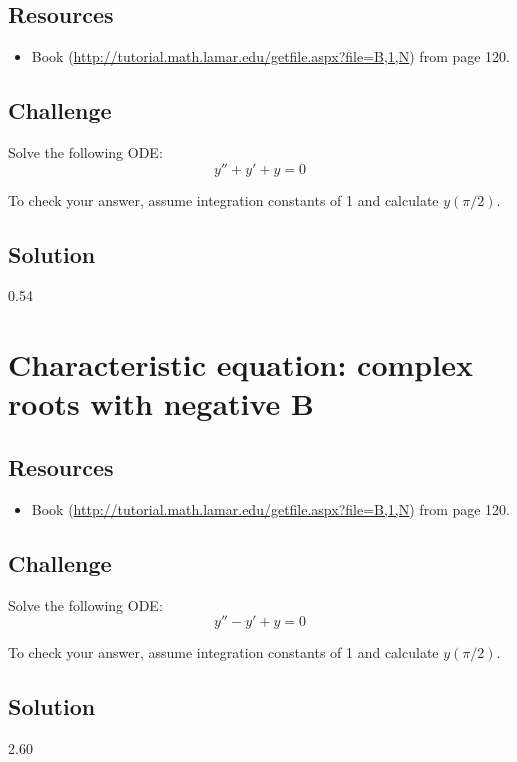 \subsection*{Resources}
\begin{itemize}
    \item Book (\url{http://tutorial.math.lamar.edu/getfile.aspx?file=B,1,N}) from page 120.
\end{itemize}

\subsection*{Challenge}
Solve the following ODE:
\begin{equation}
    y'' + y' + y = 0
\end{equation}

To check your answer, assume integration constants of 1 and calculate $y(\pi/2)$.

\subsection*{Solution}
0.54




\newpage
\section{Characteristic equation: complex roots with negative B}

\subsection*{Resources}
\begin{itemize}
    \item Book (\url{http://tutorial.math.lamar.edu/getfile.aspx?file=B,1,N}) from page 120.
\end{itemize}

\subsection*{Challenge}
Solve the following ODE:
\begin{equation}
    y'' - y' + y = 0
\end{equation}

To check your answer, assume integration constants of 1 and calculate $y(\pi/2)$.

\subsection*{Solution}
2.60




